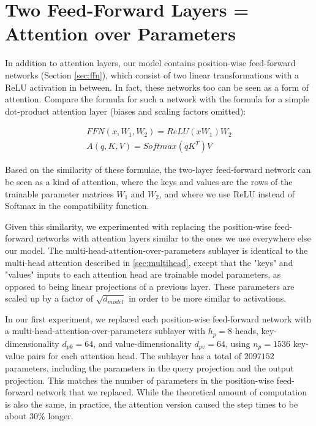 \pagebreak
\section*{Two Feed-Forward Layers = Attention over
  Parameters}\label{sec:parameter_attention}

In addition to attention layers, our model contains position-wise feed-forward
networks (Section \ref{sec:ffn}), which consist of two linear transformations
with a ReLU activation in between.  In fact, these networks too can be seen as
a form of attention.  Compare the formula for such a network with the formula
for a simple dot-product attention layer (biases and scaling factors omitted):

\begin{align*}
    FFN(x, W_1, W_2) = ReLU(xW_1)W_2 \\
    A(q, K, V) = Softmax(qK^T)V
\end{align*}

Based on the similarity of these formulae, the two-layer feed-forward network
can be seen as a kind of attention, where the keys and values are the rows of
the trainable parameter matrices $W_1$ and $W_2$, and where we use ReLU instead
of Softmax in the compatibility function.


Given this similarity, we experimented with replacing the position-wise
feed-forward networks with attention layers similar to the ones we use
everywhere else our model. The multi-head-attention-over-parameters sublayer is
identical to the multi-head attention described in \ref{sec:multihead}, except
that the "keys" and "values" inputs to each attention head are trainable model
parameters, as opposed to being linear projections of a previous layer.  These
parameters are scaled up by a factor of $\sqrt{d_{model}}$ in order to be more
similar to activations.

In our first experiment, we replaced each position-wise feed-forward network
with a multi-head-attention-over-parameters sublayer with $h_p=8$ heads,
key-dimensionality $d_{pk}=64$, and value-dimensionality $d_{pv}=64$, using
$n_p=1536$ key-value pairs for each attention head.  The sublayer has a total
of $2097152$ parameters, including the parameters in the query projection and
the output projection.	This matches the number of parameters in the
position-wise feed-forward network that we replaced.  While the theoretical
amount of computation is also the same, in practice, the attention version
caused the step times to be about 30\% longer.

